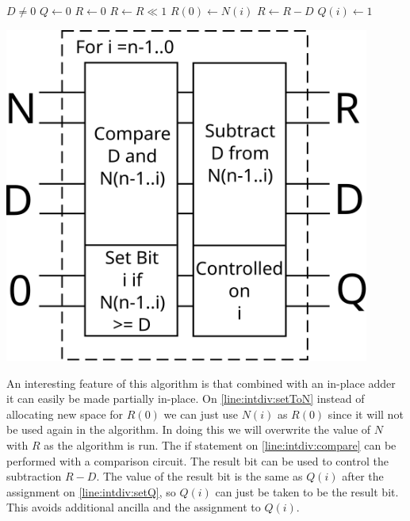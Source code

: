     \noindent\begin{minipage}{.5\textwidth}
          \label{algo:intdiv}
         \begin{algorithmic}[1]
           \Require $D \neq 0$
           \State $Q \gets 0$
           \State $R \gets 0$
             \State $R \gets R \ll 1$
             \State $R(0) \gets N(i)$ \label{line:intdiv:setToN}
              \label{line:intdiv:compare}
               \State $R\gets R - D$
               \State $Q(i) \gets 1$ \label{line:intdiv:setQ}
             \EndIf
           \EndFor
         \end{algorithmic}
    \end{minipage}%
    \begin{minipage}{.5\textwidth}
        \centering
        \includegraphics[width=0.9\textwidth]{images/division}
         \label{fig:div}
    \end{minipage}
    \medskip

    An interesting feature of this algorithm is that combined with an in-place
    adder\cite{CDKM:2004} it can easily be made partially in-place.  On
    \cref{line:intdiv:setToN} instead of allocating new space for $R(0)$ we can
    just use $N(i)$ as $R(0)$ since it will not be used again in the algorithm.
    In doing this we will overwrite the value of $N$ with $R$ as the algorithm
    is run.  The if statement on \cref{line:intdiv:compare} can be performed
    with a comparison circuit.  The result bit can be used to control the
    subtraction $R-D$.  The value of the result bit is the same as $Q(i)$ after
    the assignment on \cref{line:intdiv:setQ}, so $Q(i)$ can just be taken to
    be the result bit.  This avoids additional ancilla and the assignment to
    $Q(i)$.

